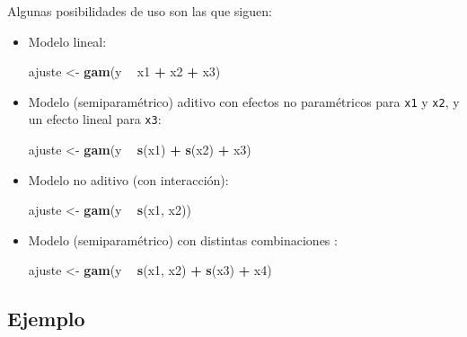 \documentclass[
]{book}
\newenvironment{Shaded}{\begin{snugshade}}{\end{snugshade}}
\newcommand{\KeywordTok}[1]{\textcolor[rgb]{0.13,0.29,0.53}{\textbf{#1}}}
\newcommand{\NormalTok}[1]{#1}
\newcommand{\OperatorTok}[1]{\textcolor[rgb]{0.81,0.36,0.00}{\textbf{#1}}}
\newcommand{\StringTok}[1]{\textcolor[rgb]{0.31,0.60,0.02}{#1}}
\theoremstyle{break}
\theoremstyle{definition}
\theoremstyle{definition}
\theoremstyle{definition}
\theoremstyle{remark}
\begin{document}
Algunas posibilidades de uso son las que siguen:

\begin{itemize}
\item
  Modelo lineal:

\begin{Shaded}
\begin{Highlighting}[]
\NormalTok{ajuste <-}\StringTok{ }\KeywordTok{gam}\NormalTok{(y }\OperatorTok{~}\StringTok{ }\NormalTok{x1 }\OperatorTok{+}\StringTok{ }\NormalTok{x2 }\OperatorTok{+}\StringTok{ }\NormalTok{x3)}
\end{Highlighting}
\end{Shaded}
\item
  Modelo (semiparamétrico) aditivo con efectos no paramétricos para \texttt{x1} y \texttt{x2}, y un efecto lineal para \texttt{x3}:

\begin{Shaded}
\begin{Highlighting}[]
\NormalTok{ajuste <-}\StringTok{ }\KeywordTok{gam}\NormalTok{(y }\OperatorTok{~}\StringTok{ }\KeywordTok{s}\NormalTok{(x1) }\OperatorTok{+}\StringTok{ }\KeywordTok{s}\NormalTok{(x2) }\OperatorTok{+}\StringTok{ }\NormalTok{x3)}
\end{Highlighting}
\end{Shaded}
\item
  Modelo no aditivo (con interacción):

\begin{Shaded}
\begin{Highlighting}[]
\NormalTok{ajuste <-}\StringTok{ }\KeywordTok{gam}\NormalTok{(y }\OperatorTok{~}\StringTok{ }\KeywordTok{s}\NormalTok{(x1, x2))}
\end{Highlighting}
\end{Shaded}
\item
  Modelo (semiparamétrico) con distintas combinaciones :

\begin{Shaded}
\begin{Highlighting}[]
\NormalTok{ajuste <-}\StringTok{ }\KeywordTok{gam}\NormalTok{(y }\OperatorTok{~}\StringTok{ }\KeywordTok{s}\NormalTok{(x1, x2) }\OperatorTok{+}\StringTok{ }\KeywordTok{s}\NormalTok{(x3) }\OperatorTok{+}\StringTok{ }\NormalTok{x4)}
\end{Highlighting}
\end{Shaded}
\end{itemize}

\hypertarget{ejemplo-2}{%
\subsection{Ejemplo}\label{ejemplo-2}}
\end{document}
